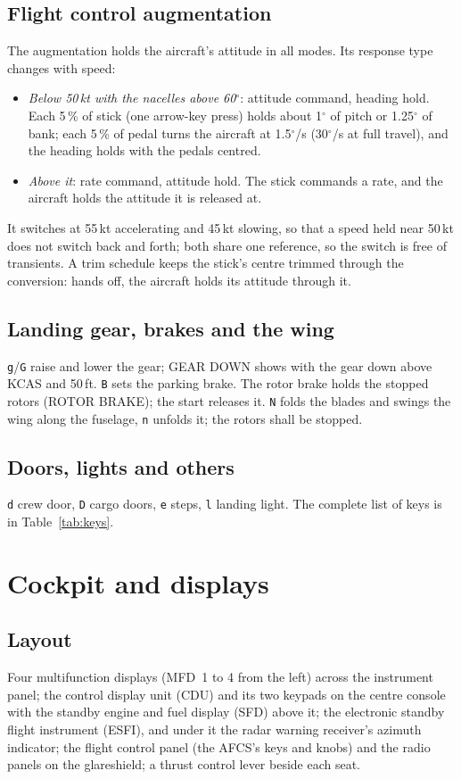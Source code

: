 \documentclass[11pt,a4paper,oneside]{book}
\newcommand{\key}[1]{\texttt{#1}}
\newcommand{\ann}[1]{\textsf{#1}}
\begin{document}
\section{Flight control augmentation}
The augmentation holds the aircraft's attitude in all modes. Its response type changes with speed:
\begin{itemize}
\item \emph{Below 50\,kt with the nacelles above 60$^\circ$}: attitude command, heading hold. Each 5\,\% of stick (one
arrow-key press) holds about 1$^\circ$ of pitch or 1.25$^\circ$ of bank; each 5\,\% of pedal turns the aircraft at
1.5$^\circ$/s (30$^\circ$/s at full travel), and the heading holds with the pedals centred.
\item \emph{Above it}: rate command, attitude hold. The stick commands a rate, and the aircraft holds the attitude it
is released at.
\end{itemize}
It switches at 55\,kt accelerating and 45\,kt slowing, so that a speed held near 50\,kt does not switch back and forth;
both share one reference, so the switch is free of transients. A trim schedule keeps the stick's centre trimmed
through the conversion: hands off, the aircraft holds its attitude through it.

\section{Landing gear, brakes and the wing}
\key{g}/\key{G} raise and lower the gear; \ann{GEAR DOWN} shows with the gear down above \MVle\,KCAS and 50\,ft. \key{B}
sets the parking brake. The rotor brake holds the stopped rotors (\ann{ROTOR BRAKE}); the start releases it. \key{N}
folds the blades and swings the wing along the fuselage, \key{n} unfolds it; the rotors shall be stopped.

\section{Doors, lights and others}
\key{d} crew door, \key{D} cargo doors, \key{e} steps, \key{l} landing light. The complete list of keys is in
Table~\ref{tab:keys}.

\chapter{Cockpit and displays}
\section{Layout}
Four multifunction displays (MFD~1 to 4 from the left) across the instrument panel; the control display unit (CDU)
and its two keypads on the centre console with the standby engine and fuel display (SFD) above it; the electronic
standby flight instrument (ESFI), and under it the radar warning receiver's azimuth indicator; the flight control panel
(the AFCS's keys and knobs) and the radio panels on the glareshield; a thrust control lever beside each seat.
\end{document}

